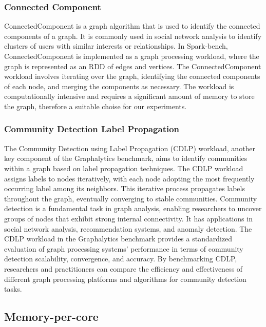 \subsubsection{Connected Component}
ConnectedComponent is a graph algorithm that is used to identify the
connected components of a graph. It is commonly used in social network
analysis to identify clusters of users with similar interests or
relationships. In Spark-bench, ConnectedComponent is implemented as a
graph processing workload, where the graph is represented as an RDD of
edges and vertices. The ConnectedComponent workload involves iterating
over the graph, identifying the connected components of each node, and
merging the components as necessary. The workload is computationally
intensive and requires a significant amount of memory to store the
graph, therefore a suitable choise for our experiments.

\subsubsection{Community Detection Label Propagation}
The Community Detection using Label Propagation (CDLP) workload, another key component of the Graphalytics benchmark, aims to identify communities within a graph based on label propagation techniques. The CDLP workload assigns labels to nodes iteratively, with each node adopting the most frequently occurring label among its neighbors. This iterative process propagates labels throughout the graph, eventually converging to stable communities. Community detection is a fundamental task in graph analysis, enabling researchers to uncover groups of nodes that exhibit strong internal connectivity. It has applications in social network analysis, recommendation systems, and anomaly detection. The CDLP workload in the Graphalytics benchmark provides a standardized evaluation of graph processing systems' performance in terms of community detection scalability, convergence, and accuracy. By benchmarking CDLP, researchers and practitioners can compare the efficiency and effectiveness of different graph processing platforms and algorithms for community detection tasks.

\subsection{Memory-per-core}

